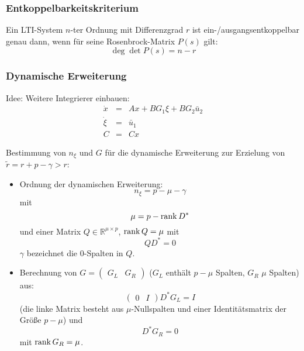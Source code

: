 \subsubsection{Entkoppelbarkeitskriterium}
Ein LTI-System $n$-ter Ordnung mit Differenzgrad $r$ ist ein-/ausgangsentkoppelbar genau
dann, wenn für seine Rosenbrock-Matrix $P(s)$ gilt:
\begin{equation}
    \deg \det P(s) = n-r
\end{equation}

\subsubsection{Dynamische Erweiterung}
Idee: Weitere Integrierer einbauen:
\begin{eqnarray}
    \dot{x} &=& Ax + BG_1 \xi + B G_2 \bar{u}_2 \\
    \dot{\xi} &=& \bar{u}_1 \\
    C &=& Cx
\end{eqnarray}

Bestimmung von $n_\xi$ und $G$ für die dynamische Erweiterung zur Erzielung von
$\tilde{r} = r+p-\gamma > r$:
\begin{itemize}
    \item Ordnung der dynamischen Erweiterung:
        \begin{equation}
            n_\xi = p - \mu - \gamma
        \end{equation}
        mit
        \begin{equation}
            \mu = p - \operatorname*{rank} D^*
        \end{equation}
        und einer Matrix $Q \in \mathbb{R}^{\mu \times p}$, $\operatorname*{rank} Q = \mu$ mit
        \begin{equation}
            Q D^* = 0
        \end{equation}
        $\gamma$ bezeichnet die $0$-Spalten in $Q$.
    \item Berechnung von $G=\begin{pmatrix}G_L & G_R\end{pmatrix}$ ($G_L$ enthält $p-\mu$ Spalten,
        $G_R$ $\mu$ Spalten) aus:
        \begin{equation}
            \begin{pmatrix} 0 & I \end{pmatrix} D^* G_L = I
        \end{equation}
        (die linke Matrix besteht aus $\mu$-Nullspalten und einer Identitätsmatrix
        der Größe $p-\mu$) und
        \begin{equation}
            D^* G_R = 0
        \end{equation}
        mit $\operatorname*{rank} G_R = \mu$.
\end{itemize} 

